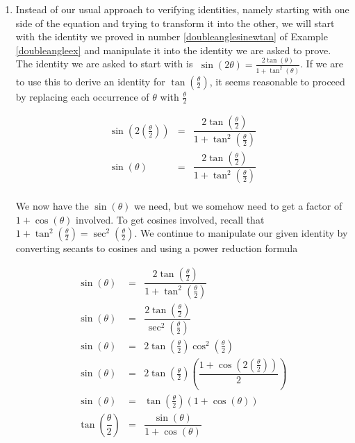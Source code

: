 {\begin{enumerate}
\item  Instead of our usual approach to verifying identities, namely starting with one side of the equation and trying to transform it into the other, we will start with the identity we proved in number \ref{doubleanglesinewtan} of Example \ref{doubleangleex} and manipulate it into the identity we are asked to prove.  The identity we are asked to start with is $\; \sin(2\theta) = \frac{2\tan(\theta)}{1 + \tan^{2}(\theta)}$.  If we are to use this to derive an identity for $\tan\left(\frac{\theta}{2}\right)$, it seems reasonable to proceed by replacing each occurrence of $\theta$ with $\frac{\theta}{2}$

\[ \begin{array}{rcl} 

\sin\left(2 \left(\frac{\theta}{2}\right)\right) & = &  \dfrac{2\tan\left(\frac{\theta}{2}\right)}{1 + \tan^{2}\left(\frac{\theta}{2}\right)} \\ [15pt]
\sin(\theta) & = & \dfrac{2\tan\left(\frac{\theta}{2}\right)}{1 + \tan^{2}\left(\frac{\theta}{2}\right)} \\ \end{array} \]

We now have the $\sin(\theta)$ we need, but we somehow need to get a factor of $1+\cos(\theta)$ involved.  To get cosines involved, recall that $1 + \tan^{2}\left(\frac{\theta}{2}\right) = \sec^{2}\left(\frac{\theta}{2}\right)$.  We continue to manipulate our given identity by converting secants to cosines and using a power reduction formula

\[ \begin{array}{rcl} 

\sin(\theta) & = &  \dfrac{2\tan\left(\frac{\theta}{2}\right)}{1 + \tan^{2}\left(\frac{\theta}{2}\right)} \\ [15pt]
\sin(\theta) & = & \dfrac{2\tan\left(\frac{\theta}{2}\right)}{\sec^{2}\left(\frac{\theta}{2}\right)} \\ [15pt]
\sin(\theta) & = & 2 \tan\left(\frac{\theta}{2}\right) \cos^{2}\left(\frac{\theta}{2}\right) \\ [5pt]
\sin(\theta) & = & 2 \tan\left(\frac{\theta}{2}\right) \left(\dfrac{1 + \cos\left(2 \left(\frac{\theta}{2}\right)\right)}{2}\right) \\ [15pt]
\sin(\theta) & = &  \tan\left(\frac{\theta}{2}\right) \left(1+\cos(\theta) \right) \\ [5pt]
\tan\left(\dfrac{\theta}{2}\right) & = & \dfrac{\sin(\theta)}{1+\cos(\theta)} \\ 
\end{array}  \]

\end{enumerate}
}

